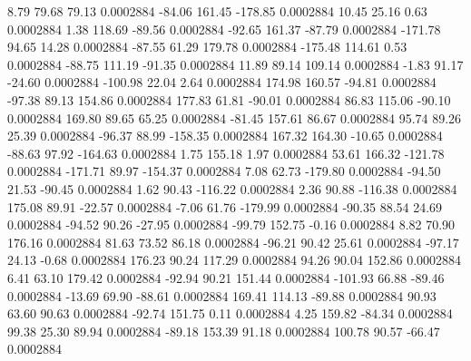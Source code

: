         8.79       79.68       79.13     0.0002884
      -84.06      161.45     -178.85     0.0002884
       10.45       25.16        0.63     0.0002884
        1.38      118.69      -89.56     0.0002884
      -92.65      161.37      -87.79     0.0002884
     -171.78       94.65       14.28     0.0002884
      -87.55       61.29      179.78     0.0002884
     -175.48      114.61        0.53     0.0002884
      -88.75      111.19      -91.35     0.0002884
       11.89       89.14      109.14     0.0002884
       -1.83       91.17      -24.60     0.0002884
     -100.98       22.04        2.64     0.0002884
      174.98      160.57      -94.81     0.0002884
      -97.38       89.13      154.86     0.0002884
      177.83       61.81      -90.01     0.0002884
       86.83      115.06      -90.10     0.0002884
      169.80       89.65       65.25     0.0002884
      -81.45      157.61       86.67     0.0002884
       95.74       89.26       25.39     0.0002884
      -96.37       88.99     -158.35     0.0002884
      167.32      164.30      -10.65     0.0002884
      -88.63       97.92     -164.63     0.0002884
        1.75      155.18        1.97     0.0002884
       53.61      166.32     -121.78     0.0002884
     -171.71       89.97     -154.37     0.0002884
        7.08       62.73     -179.80     0.0002884
      -94.50       21.53      -90.45     0.0002884
        1.62       90.43     -116.22     0.0002884
        2.36       90.88     -116.38     0.0002884
      175.08       89.91      -22.57     0.0002884
       -7.06       61.76     -179.99     0.0002884
      -90.35       88.54       24.69     0.0002884
      -94.52       90.26      -27.95     0.0002884
      -99.79      152.75       -0.16     0.0002884
        8.82       70.90      176.16     0.0002884
       81.63       73.52       86.18     0.0002884
      -96.21       90.42       25.61     0.0002884
      -97.17       24.13       -0.68     0.0002884
      176.23       90.24      117.29     0.0002884
       94.26       90.04      152.86     0.0002884
        6.41       63.10      179.42     0.0002884
      -92.94       90.21      151.44     0.0002884
     -101.93       66.88      -89.46     0.0002884
      -13.69       69.90      -88.61     0.0002884
      169.41      114.13      -89.88     0.0002884
       90.93       63.60       90.63     0.0002884
      -92.74      151.75        0.11     0.0002884
        4.25      159.82      -84.34     0.0002884
       99.38       25.30       89.94     0.0002884
      -89.18      153.39       91.18     0.0002884
      100.78       90.57      -66.47     0.0002884

